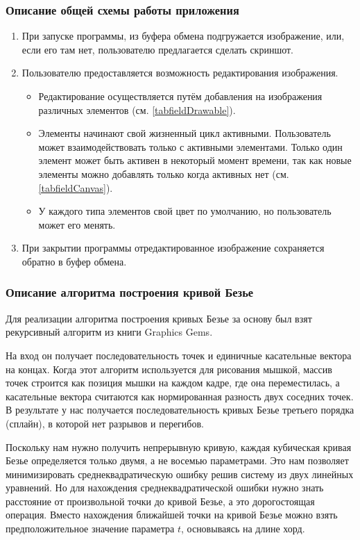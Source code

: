 \documentclass[a4paper,12pt]{article}
\begin{document}
  \subsubsection{Описание общей схемы работы приложения}
  \begin{enumerate}
    \item При запуске программы, из буфера обмена подгружается изображение, или, если его там нет, пользователю предлагается сделать скриншот.
    \item Пользователю предоставляется возможность редактирования изображения.
    \begin{itemize}
      \item Редактирование осуществляется путём добавления на изображения различных элементов (см. \autoref{tabfieldDrawable}).
      \item Элементы начинают свой жизненный цикл активными.
      Пользователь может взаимодействовать только с активными элементами.
      Только один элемент может быть активен в некоторый момент времени,
      так как новые элементы можно добавлять только когда активных нет (см. \autoref{tabfieldCanvas}).
      \item У каждого типа элементов свой цвет по умолчанию, но пользователь может его менять.
    \end{itemize}
    \item При закрытии программы отредактированное изображение сохраняется обратно в буфер обмена.
  \end{enumerate}

  \subsubsection{Описание алгоритма построения кривой Безье}
  \label{sec:curvealgo}
  Для реализации алгоритма построения кривых Безье за основу был взят рекурсивный алгоритм из книги Graphics Gems\cite{algo}.

  На вход он получает последовательность точек и единичные касательные вектора на концах.
  Когда этот алгоритм используется для рисования мышкой, массив точек строится как позиция мышки на каждом кадре, где она переместилась,
  а касательные вектора считаются как нормированная разность двух соседних точек.
  В результате у нас получается последовательность кривых Безье третьего порядка (сплайн), в которой нет разрывов и перегибов.

  Поскольку нам нужно получить непрерывную кривую, каждая кубическая кривая Безье определяется только двумя, а не восемью параметрами.
  Это нам позволяет минимизировать среднеквадратическую ошибку решив систему из двух линейных уравнений.
  Но для нахождения среднеквадратической ошибки нужно знать расстояние от произвольной точки до кривой Безье,
  а это дорогостоящая операция.
  Вместо нахождения ближайшей точки на кривой Безье можно взять предположительное значение параметра $t$,
  основываясь на длине хорд\cite{chordlength}.
\end{document}
